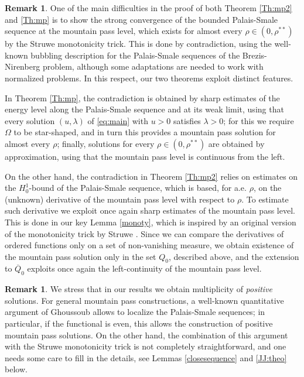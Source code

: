 \documentclass[10pt]{article}
\theoremstyle{definition}
\newtheorem{remark}[proposition]{Remark}
\numberwithin{equation}{section}
\begin{document}
\begin{remark}\label{rmk:normvslevinstrongconv}
One of the main difficulties in the proof of both Theorem \ref{Th:mp2} and \ref{Th:mp} is 
to show the strong convergence of the bounded Palais-Smale sequence at the mountain pass level, 
which exists for almost every $\rho\in(0,\rho^{**})$ by the Struwe monotonicity trick. This 
is done by contradiction, using the well-known bubbling description for the Palais-Smale sequences 
of the Brezis-Nirenberg problem, although some adaptations are needed to work with normalized problems.  
In this respect, our two theorems exploit distinct features. 

In Theorem \ref{Th:mp}, the contradiction is obtained by sharp estimates of the energy level along 
the Palais-Smale sequence and at its weak limit, using that every solution $(u,\lambda)$ of \eqref{eq:main} with $u>0$ 
satisfies $\lambda>0$; for this we require $\Omega$ to be star-shaped, and in turn this provides a 
mountain pass solution for almost every $\rho$; finally, solutions for every $\rho\in(0,\rho^{**})$ are 
obtained by approximation, using that the mountain pass level is continuous from the left.

On the other hand, the contradiction in Theorem \ref{Th:mp2} relies on estimates on the $H^1_0$-bound 
of the Palais-Smale sequence, which is based, for a.e. $\rho$, on the (unknown) derivative of the 
mountain pass level with respect to $\rho$. To estimate such derivative we exploit once again sharp 
estimates of the mountain pass level. This is done in our key Lemma \ref{monoty}, which is inspired 
by an original version of the monotonicity trick by Struwe \cite[Lemma 2]{MR1245097}. Since we 
can compare the derivatives of ordered functions only on a set of non-vanishing measure, we obtain 
existence of the mountain pass solution only in the set $Q_0$, described above, and the extension 
to $\overline{Q}_0$ exploits once again the left-continuity of the mountain pass level.
\end{remark}

\begin{remark}\label{rmk:posit}
We stress that in our results we obtain multiplicity of \emph{positive} solutions. For general  
mountain pass constructions, a well-known quantitative argument of Ghoussoub \cite{MR1251958}
allows to localize the Palais-Smale sequences; in particular, if the functional is even, this allows 
the construction of positive mountain pass solutions. On the other hand, the combination of 
this argument with the Struwe monotonicity trick is not completely straightforward, and one 
needs some care to fill in the details, see Lemmas \ref{closesequence} and \ref{JJ:theo} below. 
\end{remark}
\end{document}
